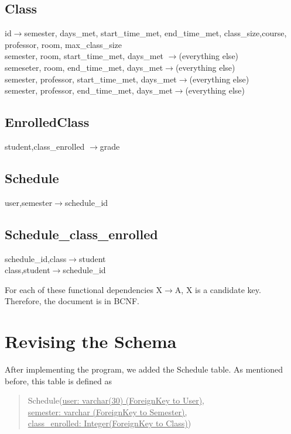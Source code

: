 \documentclass[11pt,oneside,a4paper]{article}
\begin{document}
\subsection{Class}
\hspace*{0.5in}id$\rightarrow$semester, days\_met, start\_time\_met, end\_time\_met, class\_size,course, professor, room, max\_class\_size \\
\hspace*{0.5in}semester, room, start\_time\_met, days\_met $\rightarrow$(everything else) \\
\hspace*{0.5in}semeseter, room, end\_time\_met, days\_met$\rightarrow$(everything else) \\
\hspace*{0.5in}semester, professor, start\_time\_met, days\_met$\rightarrow$(everything else) \\
\hspace*{0.5in}semester, professor, end\_time\_met, days\_met$\rightarrow$(everything else) 


\subsection{EnrolledClass}
\hspace*{0.5in}student,class\_enrolled $\rightarrow$grade


\subsection{Schedule}
\hspace*{0.5in}user,semester$\rightarrow$schedule\_id 


\subsection{Schedule\_class\_enrolled}
\hspace*{0.5in}schedule\_id,class$\rightarrow$student \\
\hspace*{0.5in}class,student$\rightarrow$schedule\_id 

For each of these functional dependencies X$\rightarrow$A, X is a candidate
key. Therefore, the document is in BCNF.
\section{Revising the Schema}
After implementing the program, we added the Schedule table. As mentioned
before, this table is defined as 
\begin{quote}
Schedule(\underline{user: varchar(30) (ForeignKey to User),} \\
\underline{semester: varchar (ForeignKey to Semester),}\\
\underline{class\_enrolled: Integer(ForeignKey to Class)})
\end{quote}
\end{document}

